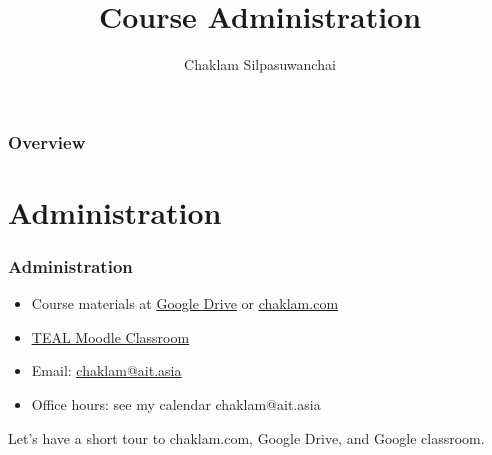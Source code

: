 \documentclass{beamer}
\title[Course Administration]{Course Administration} %
\author{Chaklam Silpasuwanchai} %
\institute[AIT] %
{
Asian Institute of Technology \\ %
\medskip
\textit{chaklam@ait.asia} %
}
\date{} %
\begin{document}
\begin{frame}
\titlepage %
\end{frame}

\begin{frame}
\frametitle{Overview} %
\tableofcontents %
\end{frame}



\section{Administration} %

\begin{frame}
\frametitle{Administration}
\begin{itemize}
	\item Course materials at \underline{\href{https://drive.google.com/drive/folders/1cHWrCKnRc1_xkWr_IgW4X-iBqm1hsnhP?usp=sharing}{Google Drive}} or \underline{\url{chaklam.com}}
	\item \underline{\href{https://teal2o.cs.ait.ac.th}{TEAL Moodle Classroom}}
	\item Email: \underline{\href{mailto:chaklam@ait.asia}{chaklam@ait.asia}} 
	\item Office hours: see my calendar chaklam@ait.asia
\end{itemize}
\vspace{0.2cm}
Let's have a short tour to chaklam.com,  Google Drive,  and Google classroom.
\end{frame}
\end{document}
